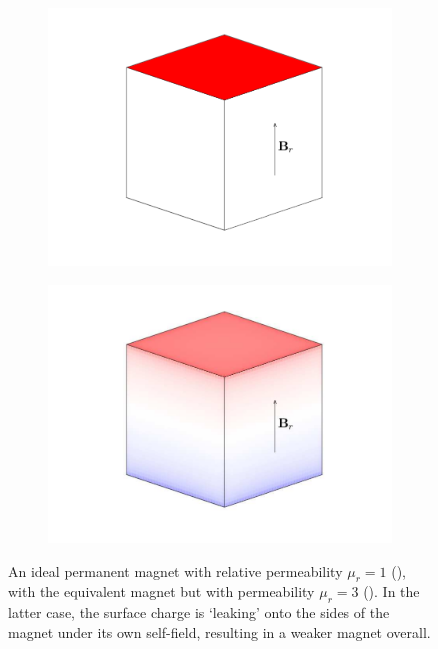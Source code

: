 \begin{figure}
    \centering
    \begin{subfigure}{\textwidth}
        \centering
        \includegraphics[width=0.65\linewidth]{p4/p4FIG1a}
        \caption{}\label{fig:introSingleMagnetIdealised}
    \end{subfigure}
    \begin{subfigure}{\textwidth}
        \centering
        \includegraphics[width=0.65\linewidth]{p4/p4FIG1b}
        \caption{}\label{fig:introSingleMagnetNonideal}
    \end{subfigure}
    \caption{An ideal permanent magnet with relative permeability \(\mu_r = 1\) (), with the equivalent magnet but with permeability \(\mu_r = 3\) (). In the latter case, the surface charge is `leaking' onto the sides of the magnet under its own self-field, resulting in a weaker magnet overall.}
    \label{fig:permeabilityOnMagnet}
\end{figure}

